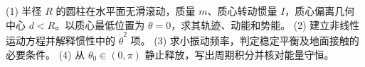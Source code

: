 (1) 半径 \(R\) 的圆柱在水平面无滑滚动，质量 \(m\)、质心转动惯量 \(I\)，质心偏离几何中心 \(d<R\)。以质心最低位置为 \(\theta=0\)，求其轨迹、动能和势能。
(2) 建立非线性运动方程并解释惯性中的 \(\dot\theta^2\) 项。
(3) 求小振动频率，判定稳定平衡及地面接触的必要条件。
(4) 从 \(\theta_0\in(0,\pi)\) 静止释放，写出周期积分并核对能量守恒。
